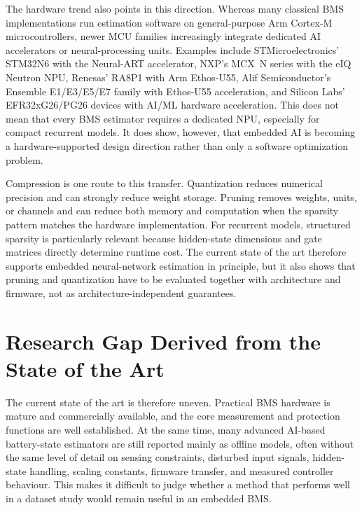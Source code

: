 \documentclass[
    a4paper,
    12pt,
    titlepage,
    bibliography=totoc,
    twoside=on,
    parskip=false,
    numbers=noenddot,
    cleardoublepage=empty,
    DIV=12,
    BCOR=12.0mm,
    headheight=36pt,
    headings=openright
]{scrreprt}
\begin{document}
The hardware trend also points in this direction. Whereas many classical BMS implementations run estimation software on general-purpose Arm Cortex-M microcontrollers, newer MCU families increasingly integrate dedicated AI accelerators or neural-processing units. Examples include STMicroelectronics' STM32N6 with the Neural-ART accelerator, NXP's MCX~N series with the eIQ Neutron NPU, Renesas' RA8P1 with Arm Ethos-U55, Alif Semiconductor's Ensemble E1/E3/E5/E7 family with Ethos-U55 acceleration, and Silicon Labs' EFR32xG26/PG26 devices with AI/ML hardware acceleration.\autocite{zotero-item-518,zotero-item-519,zotero-item-520,zotero-item-522,zotero-item-523} This does not mean that every BMS estimator requires a dedicated NPU, especially for compact recurrent models. It does show, however, that embedded AI is becoming a hardware-supported design direction rather than only a software optimization problem.

Compression is one route to this transfer. Quantization reduces numerical precision and can strongly reduce weight storage. Pruning removes weights, units, or channels and can reduce both memory and computation when the sparsity pattern matches the hardware implementation.\autocite{hanLearningBothWeights2015,blalockWhatStateNeural2020,jacobQuantizationTrainingNeural2017,krishnamoorthiQuantizingDeepConvolutional2018} For recurrent models, structured sparsity is particularly relevant because hidden-state dimensions and gate matrices directly determine runtime cost.\autocite{wenLearningStructuredSparsity2016,wenLearningIntrinsicSparse2017,narangExploringSparsityRecurrent2017,lobachevaStructuredSparsificationGated2020} The current state of the art therefore supports embedded neural-network estimation in principle, but it also shows that pruning and quantization have to be evaluated together with architecture and firmware, not as architecture-independent guarantees.\autocite{schulzePQBenchBenchmarking2025,abushahlaNeuralNetworkQuantization2026}

\section{Research Gap Derived from the State of the Art}
The current state of the art is therefore uneven. Practical BMS hardware is mature and commercially available, and the core measurement and protection functions are well established. At the same time, many advanced AI-based battery-state estimators are still reported mainly as offline models, often without the same level of detail on sensing constraints, disturbed input signals, hidden-state handling, scaling constants, firmware transfer, and measured controller behaviour. This makes it difficult to judge whether a method that performs well in a dataset study would remain useful in an embedded BMS.
\end{document}
